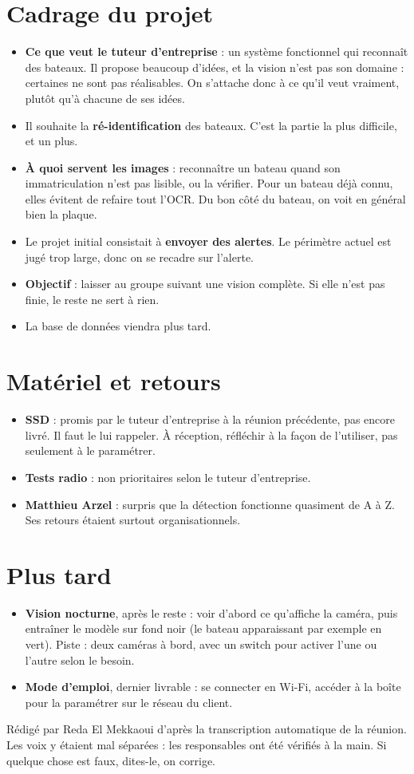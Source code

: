 \documentclass[10pt,a4paper]{article}
\begin{document}
\newpage

\section{Cadrage du projet}
\begin{itemize}
  \item \textbf{Ce que veut le tuteur d'entreprise} : un système fonctionnel qui reconnaît des bateaux. Il propose beaucoup d'idées, et la vision n'est pas son domaine : certaines ne sont pas réalisables. On s'attache donc à ce qu'il veut vraiment, plutôt qu'à chacune de ses idées.
  \item Il souhaite la \textbf{ré-identification} des bateaux. C'est la partie la plus difficile, et un plus.
  \item \textbf{À quoi servent les images} : reconnaître un bateau quand son immatriculation n'est pas lisible, ou la vérifier. Pour un bateau déjà connu, elles évitent de refaire tout l'OCR. Du bon côté du bateau, on voit en général bien la plaque.
  \item Le projet initial consistait à \textbf{envoyer des alertes}. Le périmètre actuel est jugé trop large, donc on se recadre sur l'alerte.
  \item \textbf{Objectif} : laisser au groupe suivant une vision complète. Si elle n'est pas finie, le reste ne sert à rien.
  \item La base de données viendra plus tard.
\end{itemize}

\section{Matériel et retours}
\begin{itemize}
  \item \textbf{SSD} : promis par le tuteur d'entreprise à la réunion précédente, pas encore livré. Il faut le lui rappeler. À réception, réfléchir à la façon de l'utiliser, pas seulement à le paramétrer.
  \item \textbf{Tests radio} : non prioritaires selon le tuteur d'entreprise.
  \item \textbf{Matthieu Arzel} : surpris que la détection fonctionne quasiment de A à Z. Ses retours étaient surtout organisationnels.
\end{itemize}

\section{Plus tard}
\begin{itemize}
  \item \textbf{Vision nocturne}, après le reste : voir d'abord ce qu'affiche la caméra, puis entraîner le modèle sur fond noir (le bateau apparaissant par exemple en vert). Piste : deux caméras à bord, avec un switch pour activer l'une ou l'autre selon le besoin.
  \item \textbf{Mode d'emploi}, dernier livrable : se connecter en Wi-Fi, accéder à la boîte pour la paramétrer sur le réseau du client.
\end{itemize}

\vfill
{\footnotesize\color{muted} Rédigé par Reda El Mekkaoui d'après la transcription automatique de la réunion. Les voix y étaient mal séparées : les responsables ont été vérifiés à la main. Si quelque chose est faux, dites-le, on corrige.\par}
\end{document}
